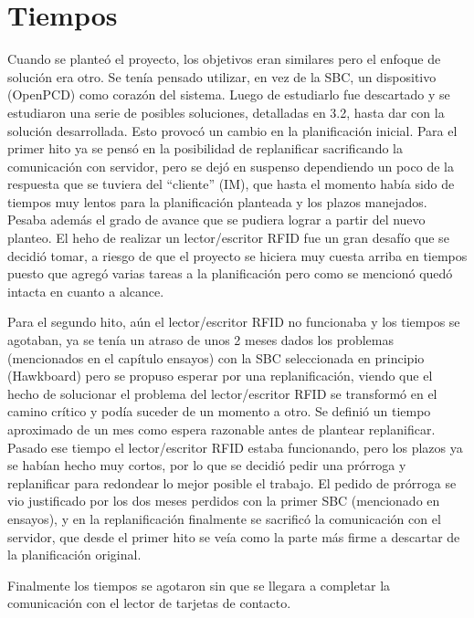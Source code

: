 \chapter{Tiempos}

Cuando se planteó el proyecto, los objetivos eran similares pero el enfoque de solución era otro. Se tenía pensado utilizar, en vez de la SBC, un dispositivo (OpenPCD) como corazón del sistema. Luego de estudiarlo fue descartado y se estudiaron una serie de posibles soluciones, detalladas en 3.2, hasta dar con la solución desarrollada. Esto provocó un cambio en la planificación inicial. Para el primer hito ya se pensó en la posibilidad de replanificar sacrificando la comunicación con servidor, pero se dejó en suspenso dependiendo un poco de la respuesta que se tuviera del “cliente” (IM), que hasta el momento había sido de tiempos muy lentos para la planificación planteada y los plazos manejados. Pesaba además el grado de avance que se pudiera lograr a partir del nuevo planteo. El heho de realizar un lector/escritor RFID fue un gran desafío que se decidió tomar, a riesgo de que el proyecto se hiciera muy cuesta arriba en tiempos puesto que agregó varias tareas a la planificación pero como se mencionó quedó intacta en cuanto a alcance.

Para el segundo hito, aún el lector/escritor RFID no funcionaba y los tiempos se agotaban, ya se tenía un atraso de unos 2 meses dados los problemas (mencionados en el capítulo ensayos) con la SBC seleccionada en principio (Hawkboard) pero se propuso esperar por una replanificación, viendo que el hecho de solucionar el problema del lector/escritor RFID se transformó en el camino crítico y podía suceder de un momento a otro. Se definió un tiempo aproximado de un mes como  espera razonable antes de plantear replanificar. Pasado ese tiempo el lector/escritor RFID estaba funcionando, pero los plazos ya se habían hecho muy cortos, por lo que se decidió pedir una prórroga y replanificar para redondear lo mejor posible el trabajo. El pedido de prórroga se vio justificado por los dos meses perdidos con la primer SBC (mencionado en ensayos), y en la replanificación finalmente se sacrificó la comunicación con el servidor, que desde el primer hito se veía como la parte más firme a descartar de la planificación original.

Finalmente los tiempos se agotaron sin que se llegara a completar la comunicación con el lector de tarjetas de contacto.